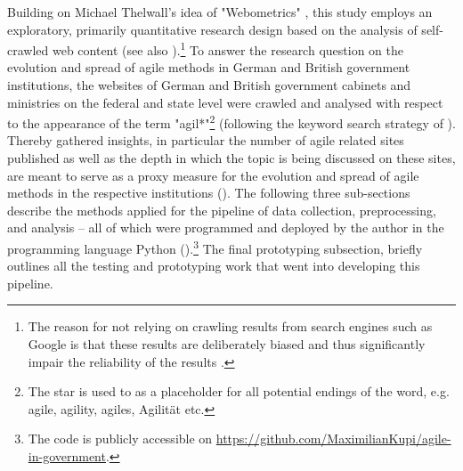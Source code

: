 Building on Michael Thelwall's idea of "Webometrics" \parencite{Thelwall2009}, this study employs an exploratory, primarily quantitative research design based on the analysis of self-crawled web content (see also \cite{Olston2010, Jaeger1998, Ignatow2018}).\footnote{The reason for not relying on crawling results from search engines such as Google is that these results are deliberately biased and thus significantly impair the reliability of the results \parencite{Cothey2004}.} To answer the research question on the evolution and spread of agile methods in German and British government institutions, the websites of German and British government cabinets and ministries on the federal and state level were crawled and analysed with respect to the appearance of the term "agil*"\footnote{The star is used to as a placeholder for all potential endings of the word, e.g. agile, agility, agiles, Agilität etc.} (following the keyword search strategy of \cite{Mergel2018}). Thereby gathered insights, in particular the number of agile related sites published as well as the depth in which the topic is being discussed on these sites, are meant to serve as a proxy measure for the evolution and spread of agile methods in the respective institutions (\cite{Branco2006, Ghosh2013}). The following three sub-sections describe the methods applied for the pipeline of data collection, preprocessing, and analysis – all of which were programmed and deployed by the author in the programming language Python (\cite{VanRossum1995}).\footnote{The code is publicly accessible on \url{https://github.com/MaximilianKupi/agile-in-government}.} The final prototyping subsection, briefly outlines all the testing and prototyping work that went into developing this pipeline.

